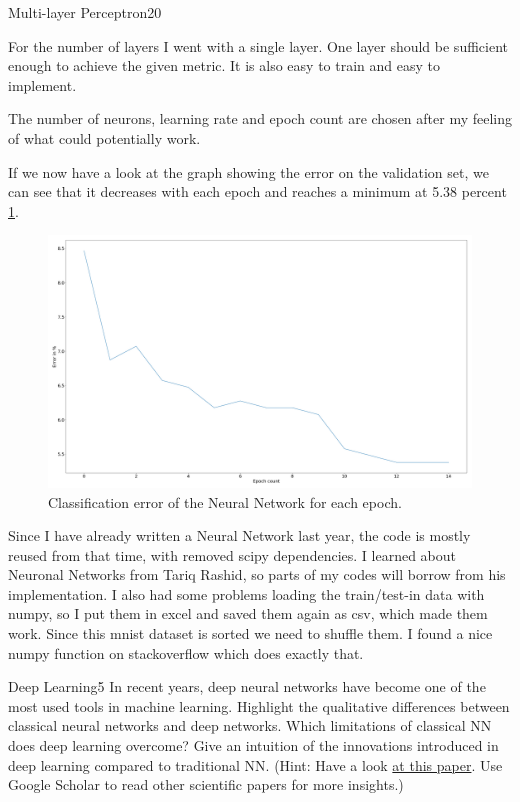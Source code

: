 \begin{questions}
\begin{question}{Multi-layer Perceptron}{20}
\begin{answer}
For the number of layers I went with a single layer. One layer should be sufficient enough to achieve the given metric. It is also easy to train and easy to implement. 

The number of neurons, learning rate and epoch count are chosen after my feeling of what could potentially work. 

If we now have a look at the graph showing the error on the validation set, we can see that it decreases with each epoch and reaches a minimum at 5.38 percent \ref{fig:nn}. 
\end{answer}
\begin{figure}[H]
	\includegraphics[width=0.8\linewidth]{pictures/NN_loss.png}
	\centering
	\caption{Classification error of the Neural Network for each epoch.}
	\label{fig:nn}
\end{figure}

Since I have already written a Neural Network last year, the code is mostly reused from that time, with removed scipy dependencies. I learned about Neuronal Networks from Tariq Rashid, so parts of my codes will borrow from his implementation. I also had some problems loading the train/test-in data with numpy, so I put them in excel and saved them again as csv, which made them work. Since this mnist dataset is sorted we need to shuffle them. I found a nice numpy function on stackoverflow which does exactly that. 

\end{question}


\begin{question}[bonus]{Deep Learning}{5}
In recent years, deep neural networks have become one of the most used tools in machine learning. 
Highlight the qualitative differences between classical neural networks and deep networks. Which limitations of classical NN does deep learning overcome?
Give an intuition of the innovations introduced in deep learning compared to traditional NN.
(Hint: Have a look \href{http://arxiv.org/abs/1206.5538}{at this paper}. Use Google Scholar to read other scientific papers for more insights.)


\end{question}
\end{questions}
